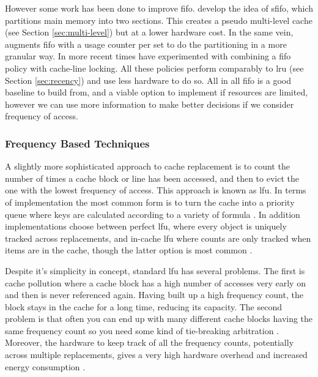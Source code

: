 However some work has been done to improve \gls{fifo}. \citet{turnerSegmentedFIFOPage1981} develop the idea of \gls{sfifo}, which partitions main memory into two sections. This creates a pseudo multi-level cache (see Section \ref{sec:multi-level}) but at a lower hardware cost. In the same vein, \citet{devilleLowcostUsagebasedReplacement1990} augments \gls{fifo} with a usage counter per set to do the partitioning in a more granular way. In more recent times \citet{wei-chetsengPRRLowoverheadCache2012} have experimented with combining a \gls{fifo} policy with cache-line locking. All these policies perform comparably to \gls{lru} (see Section \ref{sec:recency}) and use less hardware to do so. All in all \gls{fifo} is a good baseline to build from, and a viable option to implement if resources are limited, however we can use more information to make better decisions if we consider frequency of access. 

\subsubsection{Frequency Based Techniques}

A slightly more sophisticated approach to cache replacement is to count the number of times a cache block or line has been accessed, and then to evict the one with the lowest frequency of access. This approach is known as \gls{lfu}. In terms of implementation the most common form is to turn the cache into a priority queue where keys are calculated according to a variety of formula \cite{podlipnigSurveyWebCache2003}. In addition implementations choose between perfect \gls{lfu}, where every object is uniquely tracked across replacements, and in-cache \gls{lfu} where counts are only tracked when items are in the cache, though the latter option is most common \cite{podlipnigSurveyWebCache2003}.

Despite it's simplicity in concept, standard \gls{lfu} has several problems. The first is cache pollution \cite{karedlaCachingStrategiesImprove1994} where a cache block has a high number of accesses very early on and then is never referenced again. Having built up a high frequency count, the block stays in the cache for a long time, reducing its capacity. The second problem is that often you can end up with many different cache blocks having the same frequency count so you need some kind of tie-breaking arbitration \cite{podlipnigSurveyWebCache2003}.  Moreover, the hardware to keep track of all the frequency counts, potentially across multiple replacements, gives a very high hardware overhead and increased energy consumption \cite{pandaSurveyReplacementStrategies2016}. 

